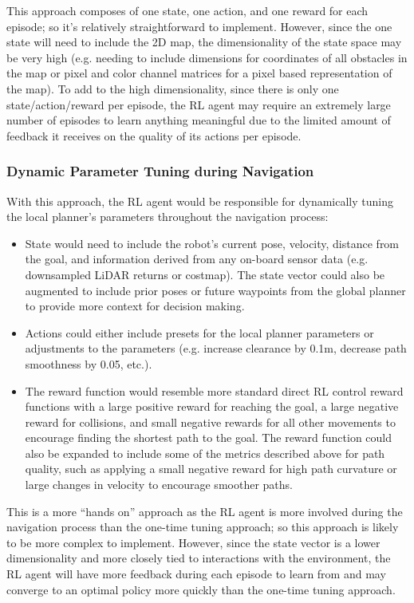 \documentclass[conference]{IEEEtran}
\begin{document}
        This approach composes of one state, one action, and one reward for each episode; so it's relatively straightforward to implement. However, since the one state will need to include the 2D map, the dimensionality of the state space may be very high (e.g. needing to include dimensions for coordinates of all obstacles in the map or pixel and color channel matrices for a pixel based representation of the map). To add to the high dimensionality, since there is only one state/action/reward per episode, the RL agent may require an extremely large number of episodes to learn anything meaningful due to the limited amount of feedback it receives on the quality of its actions per episode.

        \subsubsection{Dynamic Parameter Tuning during Navigation}
        With this approach, the RL agent would be responsible for dynamically tuning the local planner's parameters throughout the navigation process:
        \begin{itemize}
            \item State would need to include the robot's current pose, velocity, distance from the goal, and information derived from any on-board sensor data (e.g. downsampled LiDAR returns or costmap). The state vector could also be augmented to include prior poses or future waypoints from the global planner to provide more context for decision making.
            \item Actions could either include presets for the local planner parameters or adjustments to the parameters (e.g. increase clearance by 0.1m, decrease path smoothness by 0.05, etc.).
            \item The reward function would resemble more standard direct RL control reward functions with a large positive reward for reaching the goal, a large negative reward for collisions, and small negative rewards for all other movements to encourage finding the shortest path to the goal. The reward function could also be expanded to include some of the metrics described above for path quality, such as applying a small negative reward for high path curvature or large changes in velocity to encourage smoother paths.
        \end{itemize}

        This is a more ``hands on'' approach as the RL agent is more involved during the navigation process than the one-time tuning approach; so this approach is likely to be more complex to implement. However, since the state vector is a lower dimensionality and more closely tied to interactions with the environment, the RL agent will have more feedback during each episode to learn from and may converge to an optimal policy more quickly than the one-time tuning approach.
\end{document}
